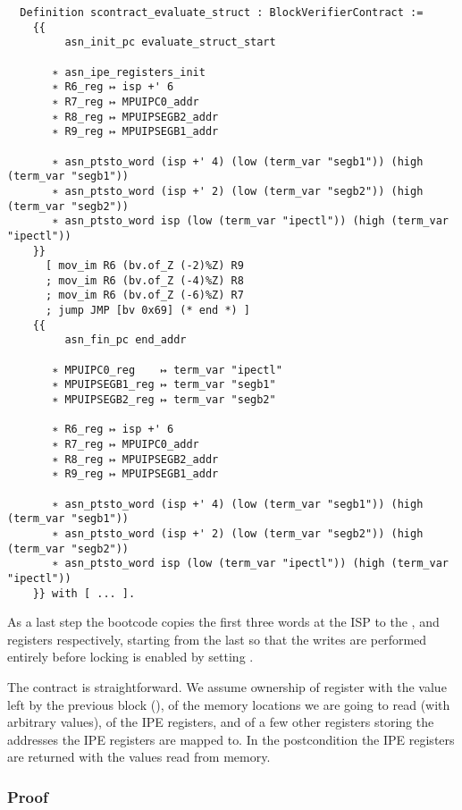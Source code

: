 \begin{verbatim}
  Definition scontract_evaluate_struct : BlockVerifierContract :=
    {{
         asn_init_pc evaluate_struct_start

       ∗ asn_ipe_registers_init
       ∗ R6_reg ↦ isp +' 6
       ∗ R7_reg ↦ MPUIPC0_addr
       ∗ R8_reg ↦ MPUIPSEGB2_addr
       ∗ R9_reg ↦ MPUIPSEGB1_addr

       ∗ asn_ptsto_word (isp +' 4) (low (term_var "segb1")) (high (term_var "segb1"))
       ∗ asn_ptsto_word (isp +' 2) (low (term_var "segb2")) (high (term_var "segb2"))
       ∗ asn_ptsto_word isp (low (term_var "ipectl")) (high (term_var "ipectl"))
    }}
      [ mov_im R6 (bv.of_Z (-2)%Z) R9
      ; mov_im R6 (bv.of_Z (-4)%Z) R8
      ; mov_im R6 (bv.of_Z (-6)%Z) R7
      ; jump JMP [bv 0x69] (* end *) ]
    {{
         asn_fin_pc end_addr

       ∗ MPUIPC0_reg    ↦ term_var "ipectl"
       ∗ MPUIPSEGB1_reg ↦ term_var "segb1"
       ∗ MPUIPSEGB2_reg ↦ term_var "segb2"

       ∗ R6_reg ↦ isp +' 6
       ∗ R7_reg ↦ MPUIPC0_addr
       ∗ R8_reg ↦ MPUIPSEGB2_addr
       ∗ R9_reg ↦ MPUIPSEGB1_addr

       ∗ asn_ptsto_word (isp +' 4) (low (term_var "segb1")) (high (term_var "segb1"))
       ∗ asn_ptsto_word (isp +' 2) (low (term_var "segb2")) (high (term_var "segb2"))
       ∗ asn_ptsto_word isp (low (term_var "ipectl")) (high (term_var "ipectl"))
    }} with [ ... ].
\end{verbatim}

As a last step the bootcode copies the first three words at the ISP to the ,  and  registers respectively, starting from the last so that the writes are performed entirely before locking is enabled by setting .

The contract is straightforward. We assume ownership of register  with the value left by the previous block (), of the memory locations we are going to read (with arbitrary values), of the IPE registers, and of a few other registers storing the addresses the IPE registers are mapped to. In the postcondition the IPE registers are returned with the values read from memory.

\subsubsection{Proof}
\label{sec:valid_evaluate_struct}

